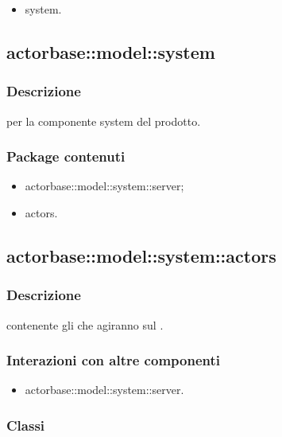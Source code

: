 \documentclass{scalatekids-article}
\begin{document}
\begin{itemize}
\item system.
\end{itemize}

\subsection{actorbase::model::system}
\label{sec:actorbase::model::system}

\subsubsection{Descrizione}

 per la componente system del prodotto.

\subsubsection{Package contenuti}

\begin{itemize}
\item actorbase::model::system::server;
\item actors.
\end{itemize}

\subsection{actorbase::model::system::actors}

\subsubsection{Descrizione}

 contenente gli  che agiranno sul .

\subsubsection{Interazioni con altre componenti}

\begin{itemize}
\item actorbase::model::system::server.
\end{itemize}

\subsubsection{Classi}
\end{document}

